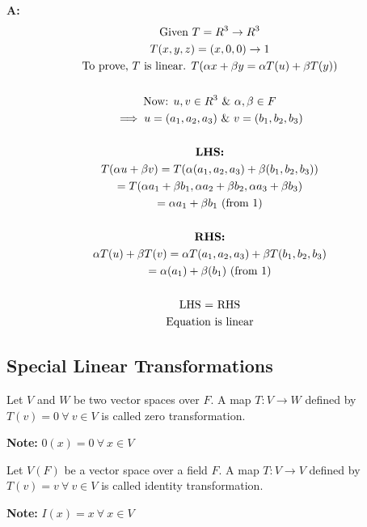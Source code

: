 \documentclass[english,course,fleqn]{lecture}
\newenvironment{qanda}{\begin{enumerate}\setlength{\parindent}{0pt}}{\medskip\end{enumerate}}
\newcommand{\A}{\par\textbf{A:} \normalfont}
\begin{document}
\begin{qanda}
	\A
	\begin{gather*}
		\text{Given } T = R^{3} \rightarrow R^{3}\\
		T(x,y,z) = (x,0,0) \rightarrow 1\\
		\text{To prove, $T$ is linear. $T(\alpha x + \beta y = \alpha T(u) + \beta T(y))$}\\
		\\
		\text{Now: } u,v \in R^{3} ~\&~ \alpha, \beta \in F\\
		\implies u = (a_{1}, a_{2}, a_{3}) ~\&~ v = (b_{1}, b_{2}, b_{3})\\
		\\
		\text{\textbf{LHS:}}\\
		T(\alpha u + \beta v) = T(\alpha (a_{1}, a_{2}, a_{3}) + \beta(b_{1}, b_{2}, b_{3}))\\
		= T(\alpha a_{1} + \beta b_{1}, \alpha a_{2} + \beta b_{2}, \alpha a_{3} + \beta b_{3})\\
		= \alpha a_{1} + \beta b_{1} \text{ (from 1)}\\
		\\
		\text{\textbf{RHS:}}\\
		\alpha T(u) + \beta T(v) = \alpha T(a_{1}, a_{2}, a_{3}) + \beta T(b_{1}, b_{2}, b_{3})\\
		= \alpha (a_{1}) + \beta (b_{1}) \text{ (from 1)}\\
		\\
		\text{LHS $=$ RHS}\\
		\text{Equation is linear}
	\end{gather*}
\end{qanda}

\newpage

\subsection{Special Linear Transformations}

\begin{definition}
	Let $V$ and $W$ be two vector spaces over $F$.
	A map $T:V\rightarrow W$ defined by $T(v) = 0 ~\forall~ v \in V$ is called zero transformation.

	\textbf{Note: } $0(x) = 0 ~\forall~ x \in V$
\end{definition}

\begin{definition}
	Let $V(F)$ be a vector space over a field $F$.
	A map $T:V\rightarrow V$ defined by $T(v) = v ~\forall~ v \in V$ is called identity transformation.

	\textbf{Note: }$I(x) = x ~\forall~ x \in V$
\end{definition}
\end{document}
